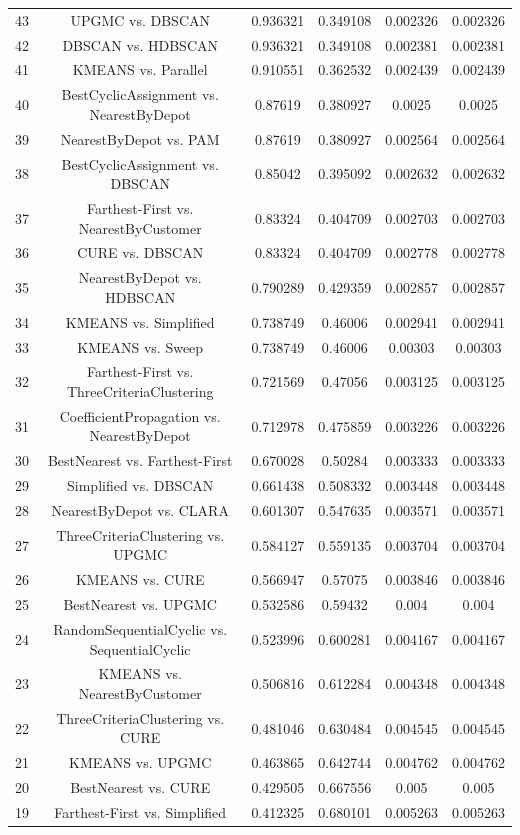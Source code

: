 \documentclass[a4paper,10pt]{article}
\begin{document}
\begin{landscape}
\begin{table}[!htp]
\begin{tabular}{cccccc}
43&UPGMC vs. DBSCAN&0.936321&0.349108&0.002326&0.002326\\
42&DBSCAN vs. HDBSCAN&0.936321&0.349108&0.002381&0.002381\\
41&KMEANS vs. Parallel&0.910551&0.362532&0.002439&0.002439\\
40&BestCyclicAssignment vs. NearestByDepot&0.87619&0.380927&0.0025&0.0025\\
39&NearestByDepot vs. PAM&0.87619&0.380927&0.002564&0.002564\\
38&BestCyclicAssignment vs. DBSCAN&0.85042&0.395092&0.002632&0.002632\\
37&Farthest-First vs. NearestByCustomer&0.83324&0.404709&0.002703&0.002703\\
36&CURE vs. DBSCAN&0.83324&0.404709&0.002778&0.002778\\
35&NearestByDepot vs. HDBSCAN&0.790289&0.429359&0.002857&0.002857\\
34&KMEANS vs. Simplified&0.738749&0.46006&0.002941&0.002941\\
33&KMEANS vs. Sweep&0.738749&0.46006&0.00303&0.00303\\
32&Farthest-First vs. ThreeCriteriaClustering&0.721569&0.47056&0.003125&0.003125\\
31&CoefficientPropagation vs. NearestByDepot&0.712978&0.475859&0.003226&0.003226\\
30&BestNearest vs. Farthest-First&0.670028&0.50284&0.003333&0.003333\\
29&Simplified vs. DBSCAN&0.661438&0.508332&0.003448&0.003448\\
28&NearestByDepot vs. CLARA&0.601307&0.547635&0.003571&0.003571\\
27&ThreeCriteriaClustering vs. UPGMC&0.584127&0.559135&0.003704&0.003704\\
26&KMEANS vs. CURE&0.566947&0.57075&0.003846&0.003846\\
25&BestNearest vs. UPGMC&0.532586&0.59432&0.004&0.004\\
24&RandomSequentialCyclic vs. SequentialCyclic&0.523996&0.600281&0.004167&0.004167\\
23&KMEANS vs. NearestByCustomer&0.506816&0.612284&0.004348&0.004348\\
22&ThreeCriteriaClustering vs. CURE&0.481046&0.630484&0.004545&0.004545\\
21&KMEANS vs. UPGMC&0.463865&0.642744&0.004762&0.004762\\
20&BestNearest vs. CURE&0.429505&0.667556&0.005&0.005\\
19&Farthest-First vs. Simplified&0.412325&0.680101&0.005263&0.005263\\

\end{tabular}
\end{table}
\end{landscape}
\end{document}
